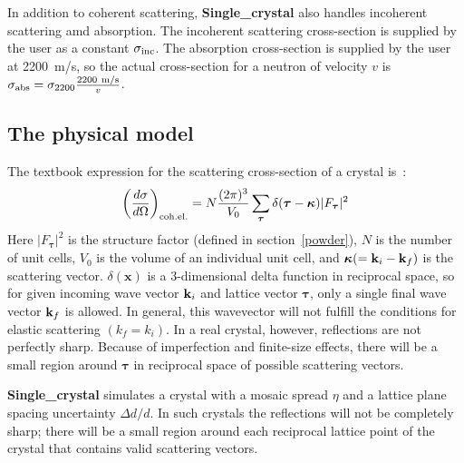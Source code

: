 In addition to coherent scattering, {\bf Single\_crystal} also
handles incoherent scattering amd absorption. The incoherent scattering
cross-section is supplied by the user as a constant
$\sigma_{\rm inc}$. The absorption cross-section is supplied by the user at
2200~m/s, so the actual cross-section for a neutron of velocity $v$ is
$\sigma_{\rm abs} = \sigma_{2200} \frac{\rm 2200~m/s}{v}$.

\subsection{The physical model}

The textbook expression for the scattering cross-section of a crystal
is~\cite[ch.3]{squires}:
\begin{equation}
\label{eq:sigma_coh_el}
\left(\frac{d\sigma}{d\Omega}\right)_{\rm coh.el.} =
        N\frac{(2\pi)^3}{V_0}\sum_{\boldsymbol{\tau}}
        \delta(\boldsymbol{\tau} - \boldsymbol{\kappa})|F_{\boldsymbol{\tau}}|^2
\end{equation}
Here $|F_{\boldsymbol{\tau}}|^2$ is the structure factor
(defined in section~\ref{powder}), $N$ is the
number of unit cells, $V_0$ is the volume of an
individual unit cell, and $\boldsymbol{\kappa} (= {\bf k}_i - {\bf k}_f)$
is the scattering vector. $\delta(\boldsymbol{x})$ is a 3-dimensional delta
function in reciprocal space,
so for given incoming wave vector ${\bf k}_i$ and lattice vector
${\boldsymbol{\tau}}$, only a single final wave vector ${\bf k}_f$ is allowed.
In general, this wavevector will not fulfill the conditions for elastic
scattering $(k_f = k_i)$.
In a real crystal, however, reflections are not perfectly sharp. Because
of imperfection and finite-size effects, there will be a small region
around $\boldsymbol{\tau}$ in reciprocal space of possible scattering vectors.

{\bf Single\_crystal} simulates a crystal with a mosaic spread
$\eta$ and a lattice plane spacing uncertainty $\Delta d/d$. In such
crystals the reflections will not be completely sharp;
there will be a small region around each reciprocal lattice point of the
crystal that contains valid scattering vectors.

